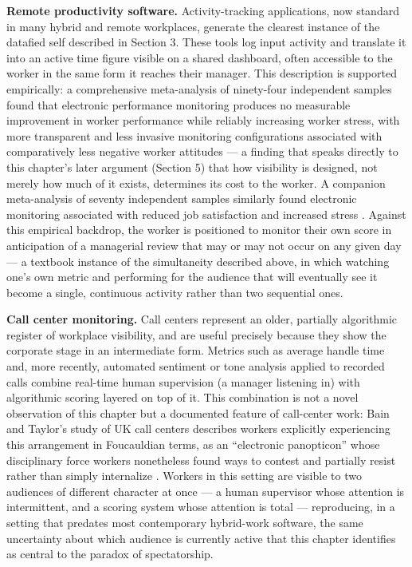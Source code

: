 \documentclass[10pt]{article}
\begin{document}
\textbf{Remote productivity software.} Activity-tracking applications, now standard in many hybrid and remote workplaces, generate the clearest instance of the datafied self described in Section 3. These tools log input activity and translate it into an active time figure visible on a shared dashboard, often accessible to the worker in the same form it reaches their manager. This description is supported empirically: a comprehensive meta-analysis of ninety-four independent samples found that electronic performance monitoring produces no measurable improvement in worker performance while reliably increasing worker stress, with more transparent and less invasive monitoring configurations associated with comparatively less negative worker attitudes \cite{ravid2023} --- a finding that speaks directly to this chapter's later argument (Section 5) that how visibility is designed, not merely how much of it exists, determines its cost to the worker. A companion meta-analysis of seventy independent samples similarly found electronic monitoring associated with reduced job satisfaction and increased stress \cite{siegel2022}. Against this empirical backdrop, the worker is positioned to monitor their own score in anticipation of a managerial review that may or may not occur on any given day --- a textbook instance of the simultaneity described above, in which watching one's own metric and performing for the audience that will eventually see it become a single, continuous activity rather than two sequential ones.

\textbf{Call center monitoring.} Call centers represent an older, partially algorithmic register of workplace visibility, and are useful precisely because they show the corporate stage in an intermediate form. Metrics such as average handle time and, more recently, automated sentiment or tone analysis applied to recorded calls combine real-time human supervision (a manager listening in) with algorithmic scoring layered on top of it. This combination is not a novel observation of this chapter but a documented feature of call-center work: Bain and Taylor's study of UK call centers describes workers explicitly experiencing this arrangement in Foucauldian terms, as an ``electronic panopticon'' whose disciplinary force workers nonetheless found ways to contest and partially resist rather than simply internalize \cite{bain2000}. Workers in this setting are visible to two audiences of different character at once --- a human supervisor whose attention is intermittent, and a scoring system whose attention is total --- reproducing, in a setting that predates most contemporary hybrid-work software, the same uncertainty about which audience is currently active that this chapter identifies as central to the paradox of spectatorship.
\end{document}
